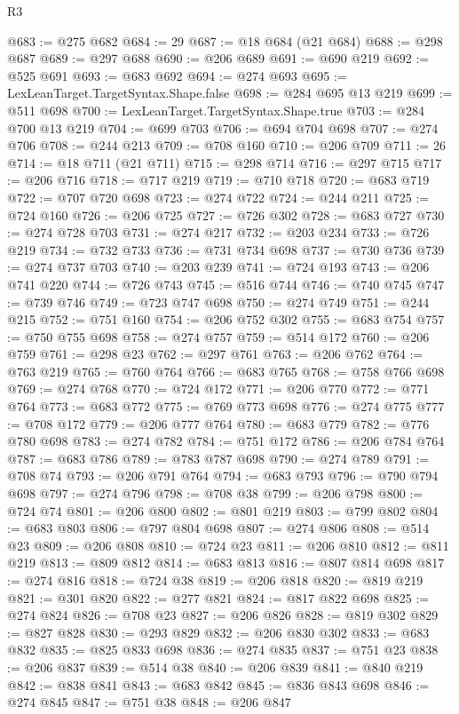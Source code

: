 \begin{lexlean}{R3}
\begin{coremodule}
@683 := @275 @682
@684 := 29
@687 := @18 @684 (@21 @684)
@688 := @298 @687
@689 := @297 @688
@690 := @206 @689
@691 := @690 @219
@692 := @525 @691
@693 := @683 @692
@694 := @274 @693
@695 := LexLeanTarget.TargetSyntax.Shape.false
@698 := @284 @695 @13 @219
@699 := @511 @698
@700 := LexLeanTarget.TargetSyntax.Shape.true
@703 := @284 @700 @13 @219
@704 := @699 @703
@706 := @694 @704 @698
@707 := @274 @706
@708 := @244 @213
@709 := @708 @160
@710 := @206 @709
@711 := 26
@714 := @18 @711 (@21 @711)
@715 := @298 @714
@716 := @297 @715
@717 := @206 @716
@718 := @717 @219
@719 := @710 @718
@720 := @683 @719
@722 := @707 @720 @698
@723 := @274 @722
@724 := @244 @211
@725 := @724 @160
@726 := @206 @725
@727 := @726 @302
@728 := @683 @727
@730 := @274 @728 @703
@731 := @274 @217
@732 := @203 @234
@733 := @726 @219
@734 := @732 @733
@736 := @731 @734 @698
@737 := @730 @736
@739 := @274 @737 @703
@740 := @203 @239
@741 := @724 @193
@743 := @206 @741 @220
@744 := @726 @743
@745 := @516 @744
@746 := @740 @745
@747 := @739 @746
@749 := @723 @747 @698
@750 := @274 @749
@751 := @244 @215
@752 := @751 @160
@754 := @206 @752 @302
@755 := @683 @754
@757 := @750 @755 @698
@758 := @274 @757
@759 := @514 @172
@760 := @206 @759
@761 := @298 @23
@762 := @297 @761
@763 := @206 @762
@764 := @763 @219
@765 := @760 @764
@766 := @683 @765
@768 := @758 @766 @698
@769 := @274 @768
@770 := @724 @172
@771 := @206 @770
@772 := @771 @764
@773 := @683 @772
@775 := @769 @773 @698
@776 := @274 @775
@777 := @708 @172
@779 := @206 @777 @764
@780 := @683 @779
@782 := @776 @780 @698
@783 := @274 @782
@784 := @751 @172
@786 := @206 @784 @764
@787 := @683 @786
@789 := @783 @787 @698
@790 := @274 @789
@791 := @708 @74
@793 := @206 @791 @764
@794 := @683 @793
@796 := @790 @794 @698
@797 := @274 @796
@798 := @708 @38
@799 := @206 @798
@800 := @724 @74
@801 := @206 @800
@802 := @801 @219
@803 := @799 @802
@804 := @683 @803
@806 := @797 @804 @698
@807 := @274 @806
@808 := @514 @23
@809 := @206 @808
@810 := @724 @23
@811 := @206 @810
@812 := @811 @219
@813 := @809 @812
@814 := @683 @813
@816 := @807 @814 @698
@817 := @274 @816
@818 := @724 @38
@819 := @206 @818
@820 := @819 @219
@821 := @301 @820
@822 := @277 @821
@824 := @817 @822 @698
@825 := @274 @824
@826 := @708 @23
@827 := @206 @826
@828 := @819 @302
@829 := @827 @828
@830 := @293 @829
@832 := @206 @830 @302
@833 := @683 @832
@835 := @825 @833 @698
@836 := @274 @835
@837 := @751 @23
@838 := @206 @837
@839 := @514 @38
@840 := @206 @839
@841 := @840 @219
@842 := @838 @841
@843 := @683 @842
@845 := @836 @843 @698
@846 := @274 @845
@847 := @751 @38
@848 := @206 @847

\end{coremodule}
\end{lexlean}
